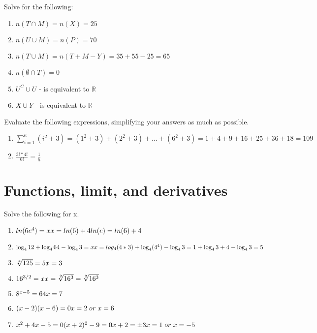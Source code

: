 \documentclass [12pt] {article}
\begin{document}
\bigskip Solve for the following: \\
 
\begin{enumerate}
    \item $n(T \cap M) = n(X) = 25 $
    \item $n(U \cup M) = n(P)=70$
    \item $n(T \cup M) = n(T +M -Y) = 35 + 55- 25 = 65$
    \item $n(\emptyset \cap T) = 0$
    \item $ U^C \cup U $ - is equivalent to $\mathbb{R}$
    \item $X \cup Y$ - is equivalent to $\mathbb{R}$
\end{enumerate}

\bigskip Evaluate the following expressions, simplifying your answers as much as possible. \\ 

\begin{enumerate}
    \item $ \displaystyle\sum_{i=1}^{6} (i^2 +3) = (1^2 +3) +(2^2 +3) +...+(6^2 +3) = 1+4 + 9+16+25+36 + 18 = 109 $
    \item $ {\displaystyle \frac{3! * 4!}{6!}}  = {\displaystyle \frac{1}{5} }$
\end{enumerate}


\newpage
\section{Functions, limit, and derivatives}
\maketitle

Solve the following for x.
\begin{enumerate}
    \item $ln(6e^4)=x \\ x = ln(6) + 4ln(e) = ln(6)+4$ 
    \item $\log_4 12 + \log_4 64 - \log_4 3 = x \\ x = log_4 (4*3)+ \log_4 (4^4) - \log_4 3 = 1+ \log_4 3 +4 -\log_4 3 = 5 $ 
    \item $\sqrt[x]{125} = 5 \\ x = 3 $
    \item $16^{3/2} = x \\ x = \sqrt[2]{16^3} = \sqrt[2]{16^3}$
    \item $8^{x-5}=64 \\ x = 7$
    \item $(x-2)(x-6) = 0 \\ x = 2 \; or \; x = 6$
    \item $x^2 +4x - 5 = 0 \\ (x+2)^2 - 9 = 0 \\ x+2 = \pm 3 \\ x = 1 \; or \; x = -5 $
\end{enumerate}
\end{document}

